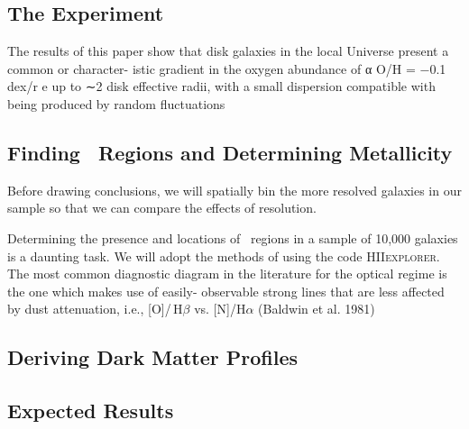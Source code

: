 \documentclass[11pt, a4paper, onecolumn]{article}
\begin{document}
\begin{multicols}{2}

\section{The Experiment}


    \citet{sanchez12} The results of this paper show that disk galaxies in the
    local Universe present a common or character- istic gradient in the oxygen
    abundance of α O/H = −0.1 dex/r e up to ∼2 disk effective radii, with a
    small dispersion compatible with being produced by random fluctuations


\subsection{Finding \hii\ Regions and Determining Metallicity}

    Before drawing conclusions, we will spatially bin the more resolved
    galaxies in our sample so that we can compare the effects of resolution.

    Determining the presence and locations of \hii\ regions in a sample of
    10,000 galaxies is a daunting task. We will adopt the methods of
    \citet{sanchez12} using the code \textsc{HIIexplorer}. The most common
    diagnostic diagram in the literature for the optical regime is the one
    which makes use of easily- observable strong lines that are less affected
    by dust attenuation, i.e., [O\iii]/\,H$\beta$ vs. [N\ii]/H$\alpha$
    (Baldwin et al. 1981)

\subsection{Deriving Dark Matter Profiles}



\subsection{Expected Results}


\end{multicols}
\end{document}
